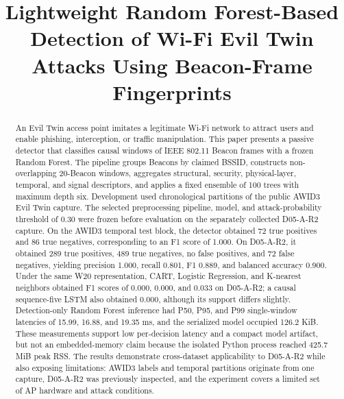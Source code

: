 \documentclass[conference]{IEEEtran}
\begin{document}
\title{Lightweight Random Forest-Based Detection of Wi-Fi Evil Twin Attacks Using Beacon-Frame Fingerprints}

\author{
}

\maketitle

\begin{abstract}
An Evil Twin access point imitates a legitimate Wi-Fi network to attract users and enable phishing, interception, or traffic manipulation. This paper presents a passive detector that classifies causal windows of IEEE 802.11 Beacon frames with a frozen Random Forest. The pipeline groups Beacons by claimed BSSID, constructs non-overlapping 20-Beacon windows, aggregates structural, security, physical-layer, temporal, and signal descriptors, and applies a fixed ensemble of 100 trees with maximum depth six. Development used chronological partitions of the public AWID3 Evil Twin capture. The selected preprocessing pipeline, model, and attack-probability threshold of 0.30 were frozen before evaluation on the separately collected D05-A-R2 capture. On the AWID3 temporal test block, the detector obtained 72 true positives and 86 true negatives, corresponding to an F1 score of 1.000. On D05-A-R2, it obtained 289 true positives, 489 true negatives, no false positives, and 72 false negatives, yielding precision 1.000, recall 0.801, F1 0.889, and balanced accuracy 0.900. Under the same W20 representation, CART, Logistic Regression, and K-nearest neighbors obtained F1 scores of 0.000, 0.000, and 0.033 on D05-A-R2; a causal sequence-five LSTM also obtained 0.000, although its support differs slightly. Detection-only Random Forest inference had P50, P95, and P99 single-window latencies of 15.99, 16.88, and 19.35 ms, and the serialized model occupied 126.2 KiB. These measurements support low per-decision latency and a compact model artifact, but not an embedded-memory claim because the isolated Python process reached 425.7 MiB peak RSS. The results demonstrate cross-dataset applicability to D05-A-R2 while also exposing limitations: AWID3 labels and temporal partitions originate from one capture, D05-A-R2 was previously inspected, and the experiment covers a limited set of AP hardware and attack conditions.
\end{abstract}
\end{document}

